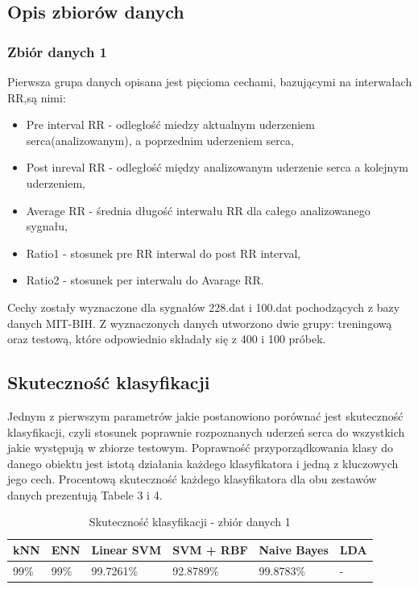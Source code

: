 \documentclass[[10pt,a4paper]{article}
\begin{document}
\subsection{Opis zbiorów danych}
\subsubsection{Zbiór danych 1}
Pierwsza grupa danych opisana jest pięcioma cechami, bazującymi na interwałach RR,są nimi:
\begin{itemize}
\item Pre interval RR - odległość miedzy aktualnym uderzeniem serca(analizowanym), a poprzednim uderzeniem serca,
\item Post inreval RR  - odległość między analizowanym uderzenie serca a kolejnym uderzeniem,
\item Average RR - średnia długość interwału RR dla całego analizowanego sygnału,
\item Ratio1 - stosunek pre RR interwal do post RR interval,
\item Ratio2 - stosunek per interwalu do Avarage RR.
\end{itemize}

Cechy zostały wyznaczone dla sygnałów 228.dat i 100.dat pochodzących z bazy danych MIT-BIH. Z wyznaczonych danych utworzono dwie grupy: treningową oraz testową, które odpowiednio składały się z 400 i 100 próbek. 


\subsection{Skuteczność klasyfikacji}

Jednym z pierwszym parametrów jakie postanowiono porównać jest skuteczność klasyfikacji, czyli stosunek poprawnie rozpoznanych uderzeń serca do wszystkich jakie występują w zbiorze testowym. Poprawność przyporządkowania klasy do danego obiektu jest istotą działania każdego klasyfikatora i jedną z kluczowych jego cech. Procentową skuteczność każdego klasyfikatora  dla obu zestawów danych prezentują Tabele 3 i 4.

\begin{table}[h]
\centering
\caption{Skuteczność klasyfikacji - zbiór danych 1}
\label{accuracyTable2}
\begin{tabular}{|l|l|l|l|l|l|}
\hline
kNN & ENN & Linear SVM & SVM + RBF & Naive Bayes & LDA \\ \hline
  99\%   &  99\%  & 99.7261\%       & 92.8789\%      & 99.8783\%        &   -  \\ \hline
\end{tabular}
\end{table}
\end{document}
